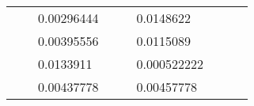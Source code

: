 \begin{table}[H]
\begin{tabular}{|cclcclccc}
\multicolumn{1}{|c|}{\cellcolor[HTML]{FFFFC7}}                                & \multicolumn{1}{c|}{\cellcolor[HTML]{DAE8FC}}                      & \multicolumn{1}{l|}{\cellcolor[HTML]{DAE8FC}0.00296444}  & \multicolumn{1}{c|}{\cellcolor[HTML]{FFFFC7}}                                & \multicolumn{1}{c|}{\cellcolor[HTML]{DAE8FC}}                       & \multicolumn{1}{l|}{\cellcolor[HTML]{DDFDFF}0.0148622}   &                                                                              &                                                                    &                                                          \\ \cline{3-3} \cline{6-6}
\multicolumn{1}{|c|}{\cellcolor[HTML]{FFFFC7}}                                & \multicolumn{1}{c|}{\cellcolor[HTML]{DAE8FC}}                      & \multicolumn{1}{l|}{\cellcolor[HTML]{DDFDFF}0.00395556}  & \multicolumn{1}{c|}{\cellcolor[HTML]{FFFFC7}}                                & \multicolumn{1}{c|}{\cellcolor[HTML]{DAE8FC}}                       & \multicolumn{1}{l|}{\cellcolor[HTML]{DAE8FC}0.0115089}   &                                                                              &                                                                    &                                                          \\ \cline{3-3} \cline{6-6}
\multicolumn{1}{|c|}{\cellcolor[HTML]{FFFFC7}}                                & \multicolumn{1}{c|}{\cellcolor[HTML]{DAE8FC}}                      & \multicolumn{1}{l|}{\cellcolor[HTML]{DAE8FC}0.0133911}   & \multicolumn{1}{c|}{\cellcolor[HTML]{FFFFC7}}                                & \multicolumn{1}{c|}{\cellcolor[HTML]{DAE8FC}}                       & \multicolumn{1}{l|}{\cellcolor[HTML]{DDFDFF}0.000522222} &                                                                              &                                                                    &                                                          \\ \cline{3-3} \cline{6-6}
\multicolumn{1}{|c|}{\cellcolor[HTML]{FFFFC7}}                                & \multicolumn{1}{c|}{\cellcolor[HTML]{DAE8FC}}                      & \multicolumn{1}{l|}{\cellcolor[HTML]{DDFDFF}0.00437778}  & \multicolumn{1}{c|}{\cellcolor[HTML]{FFFFC7}}                                & \multicolumn{1}{c|}{\cellcolor[HTML]{DAE8FC}}                       & \multicolumn{1}{l|}{\cellcolor[HTML]{DAE8FC}0.00457778}  &                                                                              &                                                                    &                                                          \\ \cline{3-3} \cline{6-6}

\end{tabular}
\end{table}
